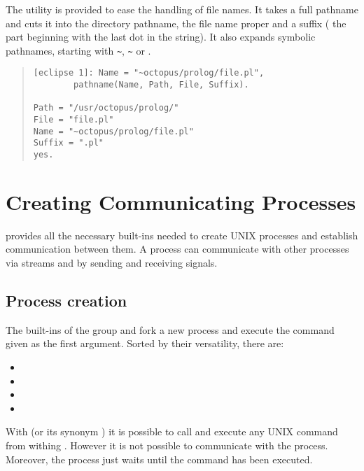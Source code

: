 The utility 
is provided to ease the handling of file names.
It takes a full pathname and cuts it into the directory
pathname, the file name proper and a suffix (
the part beginning with the last dot in the string).
It also expands symbolic pathnames, starting with \verb:~:,
\verb:~: or .
\begin{quote}
\begin{verbatim}
[eclipse 1]: Name = "~octopus/prolog/file.pl",
        pathname(Name, Path, File, Suffix).

Path = "/usr/octopus/prolog/"
File = "file.pl"
Name = "~octopus/prolog/file.pl"
Suffix = ".pl"
yes.
\end{verbatim}
\end{quote}


\section{Creating Communicating Processes}
{\eclipse} provides all the necessary built-ins needed to create UNIX processes
and establish communication between them.
A {\eclipse} process can communicate with other processes via streams and by
sending and receiving signals.

\subsection{Process creation}

The built-ins of the  group and
fork a new process and execute the command given as the first argument.
Sorted by their versatility, there are:
\begin{itemize}
\item {}
\item {}
\item {}%
\item {}%
\end{itemize}
With  (or its synonym
) it is possible to
call and execute any UNIX command from withing {\eclipse}.
However it is not possible to communicate with the process.
Moreover, the {\eclipse} process just waits until the command has been executed.

